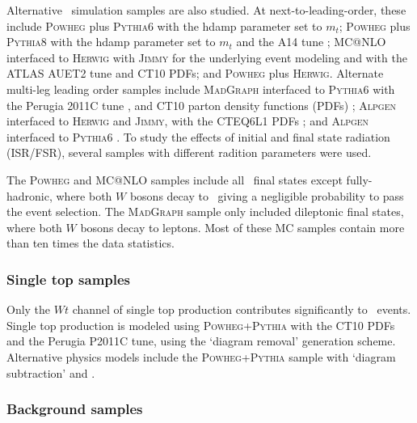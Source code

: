 
Alternative \ttbar\ simulation samples are also studied.  At next-to-leading-order, these include \textsc{  Powheg} plus \textsc{  Pythia6}  with the hdamp parameter set to $m_{t}$; \textsc{  Powheg} plus \textsc{  Pythia8} with the hdamp parameter set to $m_{t}$ and the A14 tune ; \textsc{  MC@NLO} \cite{mcatnlo, mcatnlo2} interfaced to \textsc{  Herwig} \cite{Herwig, Herwig1, Herwig2} with \textsc{  Jimmy} \cite{jimmy} for the underlying event modeling and with the ATLAS AUET2 \cite{auet} tune and CT10 PDFs; and \textsc{  Powheg} plus \textsc{  Herwig}. 
Alternate multi-leg leading order samples include \textsc{  MadGraph} \cite{Alwall:2011uj} interfaced to \textsc{  Pythia6} \cite{pythia6} with the Perugia 2011C tune \cite{perugia}, and CT10 parton density functions (PDFs) \cite{cttenpdf}; \textsc{  Alpgen} \cite{alpgen} interfaced to \textsc{  Herwig} and \textsc{  Jimmy}, with
the CTEQ6L1 PDFs \cite{CTEQ}; and \textsc{  Alpgen} interfaced to \textsc{  Pythia6}
. To study the effects of initial and final state radiation (ISR/FSR), several samples with different radition parameters were used.


The \textsc{  Powheg} and \textsc{  MC@NLO} samples include all \ttbar\ final states except fully-hadronic, where both $W$ bosons decay to \qqbar\ giving a negligible probability to pass the event selection. The \textsc{  MadGraph} sample only included dileptonic final states, where both $W$ bosons decay to leptons. Most of these MC samples contain more than ten times the data statistics.

\subsubsection{Single top samples}
Only the $Wt$ channel of single top production contributes significantly to \emubb\ events. Single top production is modeled using \textsc{  Powheg+Pythia} with the CT10 PDFs and the Perugia P2011C tune, using the `diagram removal' \cite{Frixione:2008yi} generation scheme. Alternative physics models include the \textsc{  Powheg+Pythia} sample with `diagram subtraction' \cite{Frixione:2008yi} and \mcnlohw.

\subsubsection{Background samples}\label{ss:mcbkg}

